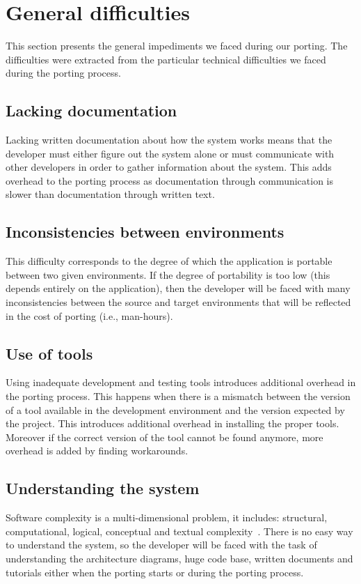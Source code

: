 \section{General difficulties}

This section presents the general impediments we faced during our porting. The
difficulties were extracted from the particular technical difficulties we faced
during the porting process.

\subsection{Lacking documentation}
Lacking written documentation about how the system works means
that the developer must either figure out the system alone or must communicate
with other developers in order to gather information about the system. This adds
overhead to the porting process as documentation through communication is
slower than documentation through written text.

\subsection{Inconsistencies between environments}
This difficulty corresponds to the degree of which the application is
portable~\cite{mooney2004developing} between two given environments. If the
degree of portability is too low (this depends entirely on the application), then
the developer will be faced with many inconsistencies between the source and
target environments that will be reflected in the cost of porting (i.e.,
man-hours).

\subsection{Use of tools}
Using inadequate development and testing tools introduces additional
overhead in the porting process. This happens when there is a mismatch between
the version of a tool available in the development environment and the version
expected by the project. This introduces additional overhead in installing the
proper tools. Moreover if the correct version of the tool cannot be found
anymore, more overhead is added by finding workarounds.

\subsection{Understanding the system}
Software complexity is a multi-dimensional problem, it includes: structural,
computational, logical, conceptual and textual complexity~\cite{ejiogu}. There
is no easy way to understand the system, so the developer will be faced with the
task of understanding the architecture diagrams, huge code base, written
documents and tutorials either when the porting starts or during the porting
process.
